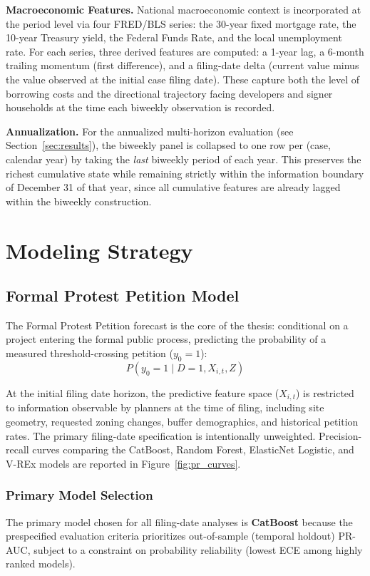 \documentclass[11pt, letterpaper, oneside]{article}
\begin{document}
\textbf{Macroeconomic Features.} National macroeconomic context is incorporated at the period level via four FRED/BLS series: the 30-year fixed mortgage rate, the 10-year Treasury yield, the Federal Funds Rate, and the local unemployment rate. For each series, three derived features are computed: a 1-year lag, a 6-month trailing momentum (first difference), and a filing-date delta (current value minus the value observed at the initial case filing date). These capture both the level of borrowing costs and the directional trajectory facing developers and signer households at the time each biweekly observation is recorded.

\textbf{Annualization.} For the annualized multi-horizon evaluation (see Section~\ref{sec:results}), the biweekly panel is collapsed to one row per (case, calendar year) by taking the \emph{last} biweekly period of each year. This preserves the richest cumulative state while remaining strictly within the information boundary of December 31 of that year, since all cumulative features are already lagged within the biweekly construction.

\section{Modeling Strategy}

\subsection{Formal Protest Petition Model}

The Formal Protest Petition forecast is the core of the thesis: conditional on a project entering the formal public process, predicting the probability of a measured threshold-crossing petition ($y_0 = 1$):
\begin{equation}
P(y_0 = 1 \mid D=1, X_{i,t}, Z)
\end{equation}

At the initial filing date horizon, the predictive feature space ($X_{i,t}$) is restricted to information observable by planners at the time of filing, including site geometry, requested zoning changes, buffer demographics, and historical petition rates. The primary filing-date specification is intentionally unweighted. Precision-recall curves comparing the CatBoost, Random Forest, ElasticNet Logistic, and V-REx models are reported in Figure~\ref{fig:pr_curves}.



\subsubsection{Primary Model Selection}
The primary model chosen for all filing-date analyses is \textbf{CatBoost} because the prespecified evaluation criteria prioritizes out-of-sample (temporal holdout) PR-AUC, subject to a constraint on probability reliability (lowest ECE among highly ranked models).
\end{document}
